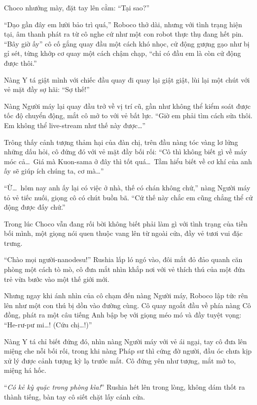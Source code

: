 \documentclass[../main.tex]{subfiles}
\begin{document}
Choco nhướng mày, đặt tay lên cằm: ``Tại sao?''

``Dạo gần đây em lười bảo trì quá,'' Roboco thở dài, nhưng với tình trạng hiện tại, âm thanh phát ra từ cô nghe cứ như một con robot thực thụ đang hết pin. ``Bây giờ ấy'' cô cố gắng quay đầu một cách khó nhọc, cử động gượng gạo như bị gỉ sét, từng khớp cơ quay một cách chậm chạp, ``chỉ có đầu em là còn cử động được thôi.''

Nàng Y tá giật mình với chiếc đầu quay đi quay lại giật giật, lùi lại một chút với vẻ mặt đầy sợ hãi: ``Sợ thế!''

Nàng Người máy lại quay đầu trở về vị trí cũ, gần như không thể kiểm soát được tốc độ chuyển động, mắt cô mở to với vẻ bất lực. ``Giờ em phải tìm cách sửa thôi. Em không thể live-stream như thế này được\dots''

Trông thấy cảnh tượng thảm hại của đàn chị, trên đầu nàng tóc vàng lơ lửng những dấu hỏi, cô đứng đó với vẻ mặt đầy bối rối: ``Cô thì không biết gì về máy móc cả\dots\ Giá mà Kuon-sama ở đây thì tốt quá\dots\ Tầm hiểu biết về cơ khí của anh ấy sẽ giúp ích chúng ta, cơ mà\dots''

``Ừ\dots\ hôm nay anh ấy lại có việc ở nhà, thế có chán không chứ,'' nàng Người máy tỏ vẻ tiếc nuối, giọng cô có chút buồn bã. ``Cứ thế này chắc em cũng chẳng thể cử động được đấy chứ.''

Trong lúc Choco vẫn đang rối bời không biết phải làm gì với tình trạng của tiền bối mình, một giọng nói quen thuộc vang lên từ ngoài cửa, đầy vẻ tươi vui đặc trưng.

``Chào mọi người-nanodesu!'' Rushia lấp ló ngó vào, đôi mắt đỏ đảo quanh căn phòng một cách tò mò, cô đưa mắt nhìn khắp nơi với vẻ thích thú của một đứa trẻ vừa bước vào một thế giới mới.

Nhưng ngay khi ánh nhìn của cô chạm đến nàng Người máy, Roboco lập tức rên lên như một con thú bị dồn vào đường cùng. Cô quay ngoắt đầu về phía nàng Cô đồng, phát ra một câu tiếng Anh bập bẹ với giọng méo mó và đầy tuyệt vọng: ``He-rư-pư mi\dots! (Cứu chị\dots!)''


Nàng Y tá chỉ biết đứng đó, nhìn nàng Người máy với vẻ ái ngại, tay cô đưa lên miệng che nỗi bối rối, trong khi nàng Pháp sư thì cứng đờ người, đầu óc chưa kịp xử lý được cảnh tượng kỳ lạ trước mắt. Cô đứng yên như tượng, mắt mở to, miệng há hốc.

``\textit{Có kẻ kỳ quặc trong phòng kìa!}'' Rushia hét lên trong lòng, không dám thốt ra thành tiếng, bàn tay cô siết chặt lấy cánh cửa.
\end{document}
